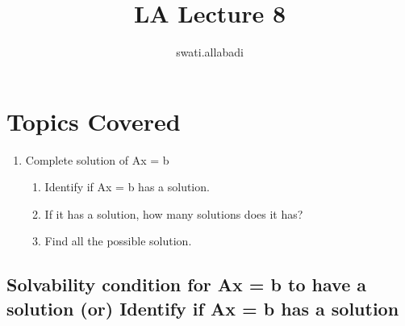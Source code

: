\documentclass{article}
\title{LA Lecture 8}
\author{swati.allabadi }
\date{}
\begin{document}
\maketitle

\section{Topics Covered}
\begin{enumerate}
    \item Complete solution of Ax = b
    \begin{enumerate}
        \item Identify if Ax = b has a solution.
        \item If it has a solution, how many solutions does it has?
        \item Find all the possible solution.
    \end{enumerate} 
\end{enumerate}

\subsection{Solvability condition for Ax = b to have a solution (or) Identify if Ax = b has a solution}
\end{document}
